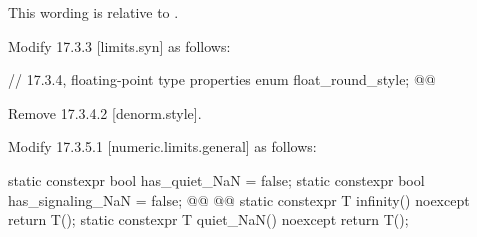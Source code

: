 This wording is relative to .

Modify 17.3.3 [limits.syn] as follows:
\begin{wgText}
\begin{codeblock}
  // 17.3.4, floating-point type properties
  enum float_round_style;
  @@

\end{codeblock}
\end{wgText}

Remove 17.3.4.2 [denorm.style].

Modify 17.3.5.1 [numeric.limits.general] as follows:
\begin{wgText}
\begin{codeblock}
    static constexpr bool has_quiet_NaN = false;
    static constexpr bool has_signaling_NaN = false;
    @@
    @@
    static constexpr T infinity() noexcept { return T(); }
    static constexpr T quiet_NaN() noexcept { return T(); }
\end{codeblock}
\end{wgText}

